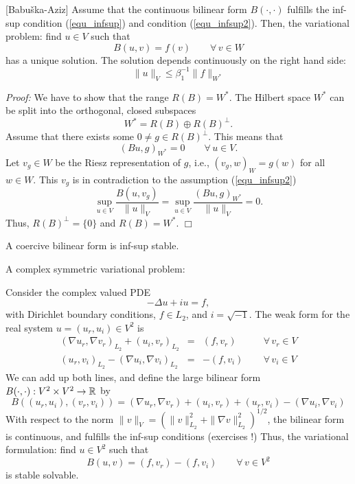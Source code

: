 \begin{theorem} \label{theo_infsup} [Babu\v{s}ka-Aziz]
Assume that the continuous bilinear form $B(\cdot,\cdot)$ fulfills
the inf-sup condition (\ref{equ_infsup}) and condition (\ref{equ_infsup2}). 
Then, the variational problem: find $u \in V$ such that
\begin{equation} \label{equ_bigsystem}
B(u,v) = f(v) \qquad \forall \, v \in W
\end{equation}
has a unique solution. The solution depends continuously on the right hand
side:
$$
\| u \|_V \leq \beta_1^{-1} \| f \|_{W^\ast}
$$
\end{theorem}
{\em Proof:} We have to show that the range $R(B) = W^\ast$. The Hilbert
space $W^\ast$ can be split into the orthogonal, closed subspaces
$$
W^\ast = R(B) \oplus R(B)^\bot.
$$
Assume that there exists some $0 \neq g \in R(B)^\bot$. This means that
$$
(B u, g)_{W^\ast} = 0 \qquad \forall \, u \in V.
$$
Let $v_g \in W$ be the Riesz representation of $g$, i.e., $(v_g, w)_W = g(w)$ for all $w \in W$. This $v_g$ is in contradiction to the assumption 
(\ref{equ_infsup2})
$$
\sup_{u \in V} \frac{B(u,v_g)}{ \| u \|_V} = 
\sup_{u \in V} \frac{(Bu,g)_{W^\ast}}{ \| u \|_V} = 
0.
$$
Thus, $R(B)^\bot = \{ 0 \}$ and $R(B) = W^\ast$.
\hfill $\Box$

\begin{example}A coercive bilinear form is inf-sup stable.
\end{example}
\begin{example}A complex symmetric variational problem:
\end{example}
\noindent
Consider the complex valued PDE 
$$
-\Delta u + i u = f,
$$
with Dirichlet boundary conditions, $f \in L_2$, and $i = \sqrt{-1}$. The
weak form for the real system $u = (u_{r}, u_i) \in V^2$ is
\begin{equation}
\begin{array}{rcll}
(\nabla u_{r}, \nabla v_{r})_{L_2} + (u_i, v_{r})_{L_2} & = &
        (f,v_{r}) \qquad & \forall \, v_r \in V \\
(u_{r}, v_i)_{L_2} -(\nabla u_i, \nabla v_i)_{L_2} & = &
        -(f,v_i) & \forall \, v_i \in V
\end{array}
\end{equation}
We can add up both lines, and define the large bilinear form $B(\cdot,\cdot) : V^2 \times V^2 \rightarrow {\mathbb R}$ by
$$
B ((u_r,u_i), (v_r, v_i)) = 
(\nabla u_{r}, \nabla v_{r}) + (u_i, v_{r}) + (u_{r}, v_i) -(\nabla u_i, \nabla v_i)
$$
With respect to the norm $\|v\|_V = ( \| v \|_{L_2}^2 + \| \nabla v \|_{L_2}^2)^{1/2}$, the bilinear form is continuous, and fulfills the inf-sup conditions
(exercises !)
Thus, the variational formulation: find $u \in V^2$ such that
$$
B(u,v) = (f,v_r) - (f,v_i) \qquad \forall \, v \in V^2
$$
is stable solvable.

